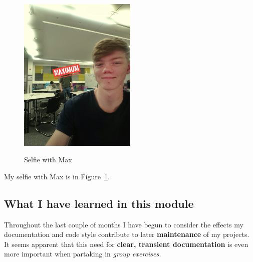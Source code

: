 \begin{figure}[h]
\caption{Selfie with Max}
\centering
\includegraphics[width=0.5\textwidth]{maxSelfieConnor}
\label{fig:selfie}
\end{figure}


My selfie with Max is in  Figure~\ref{fig:selfie}.

\subsection{What I have learned in this module}
Throughout the last couple of months I have begun to consider the effects my documentation and code style contribute to later \textbf{maintenance} of my projects. It seems apparent that this need for \textbf{clear, transient documentation} is even more important when partaking in \textit{group exercises.}

